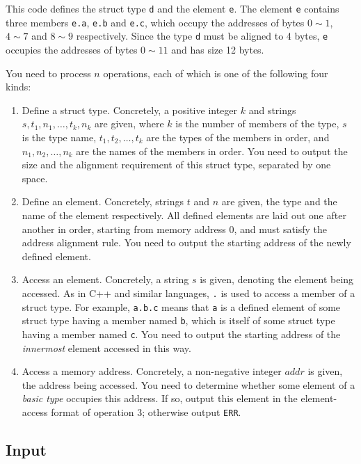 \documentclass[11pt]{article}
\begin{document}
This code defines the struct type \texttt{d} and the element \texttt{e}.
The element \texttt{e} contains three members \texttt{e.a}, \texttt{e.b}
and \texttt{e.c}, which occupy the addresses of bytes $0 \sim 1$,
$4 \sim 7$ and $8 \sim 9$ respectively.
Since the type \texttt{d} must be aligned to 4 bytes, \texttt{e}
occupies the addresses of bytes $0 \sim 11$ and has size 12 bytes.

You need to process $n$ operations, each of which is one of the following
four kinds:
\begin{enumerate}
\item Define a struct type.
  Concretely, a positive integer $k$ and strings
  $s, t_1, n_1, \ldots, t_k, n_k$ are given, where $k$ is the number of
  members of the type, $s$ is the type name, $t_1, t_2, \ldots, t_k$ are
  the types of the members in order, and $n_1, n_2, \ldots, n_k$ are the
  names of the members in order.
  You need to output the size and the alignment requirement of this
  struct type, separated by one space.
\item Define an element.
  Concretely, strings $t$ and $n$ are given, the type and the name of the
  element respectively.
  All defined elements are laid out one after another in order, starting
  from memory address 0, and must satisfy the address alignment rule.
  You need to output the starting address of the newly defined element.
\item Access an element.
  Concretely, a string $s$ is given, denoting the element being accessed.
  As in C++ and similar languages, \texttt{.} is used to access a member
  of a struct type.
  For example, \texttt{a.b.c} means that \texttt{a} is a defined element
  of some struct type having a member named \texttt{b}, which is itself of
  some struct type having a member named \texttt{c}.
  You need to output the starting address of the \emph{innermost}
  element accessed in this way.
\item Access a memory address.
  Concretely, a non-negative integer $addr$ is given, the address being
  accessed.
  You need to determine whether some element of a \emph{basic type}
  occupies this address.
  If so, output this element in the element-access format of operation 3;
  otherwise output \texttt{ERR}.
\end{enumerate}

\subsection*{Input}
\end{document}
